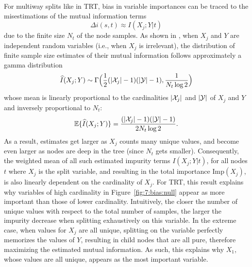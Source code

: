 For multiway splits like in TRT, bias in variable importances can be traced to the
misestimations of the mutual information terms
\begin{equation}
\Delta i(s, t) \approx I(X_j;Y|t)
\end{equation}
due to the finite size $N_t$ of the node samples. As shown in
\citep{goebel:2005}, when $X_j$ and $Y$ are independent random variables (i.e.,
when $X_j$ is irrelevant), the distribution of finite sample size estimates of
their mutual information  follows approximately a gamma distribution
\begin{equation}
\widehat{I}(X_j; Y) \sim \Gamma\Big( \frac{1}{2}(|{\cal X}_j|-1)(|{\cal Y}|-1), \frac{1}{N_t \log 2} \Big)
\end{equation}
whose mean is linearly proportional to the cardinalities $|{\cal X}_j|$ and
$|{\cal Y}|$ of $X_j$ and $Y$ and inversely proportional to $N_t$:
\begin{equation}
\mathbb{E}\{ \widehat{I}(X_j; Y) \} = \frac{(|{\cal X}_j|-1)(|{\cal Y}|-1)}{2 N_t \log 2}.
\end{equation}
As a result, estimates get larger as $X_j$ counts many unique values, and
become even larger as nodes are deep in the tree (since $N_t$ gets smaller).
Consequently, the weighted mean of all such estimated impurity terms
$I(X_j;Y|t)$, for all nodes $t$ where $X_j$ is the split variable, and
resulting in the total importance $\text{Imp}(X_j)$, is also linearly dependent
on the cardinality of $X_j$. For TRT, this result explains why variables of
high cardinality in Figure~\ref{fig:7:bias:null} appear as more important than
those of lower cardinality. Intuitively, the closer the number of unique values
with respect to the total number of samples, the larger the impurity decrease
when splitting exhaustively on this variable. In the extreme case, when values
for $X_j$ are all unique, splitting on the variable perfectly memorizes the
values of $Y$, resulting in child nodes that are all pure, therefore maximizing
the estimated mutual information. As such, this explains why $X_1$, whose
values are all unique, appears as the most important variable.

